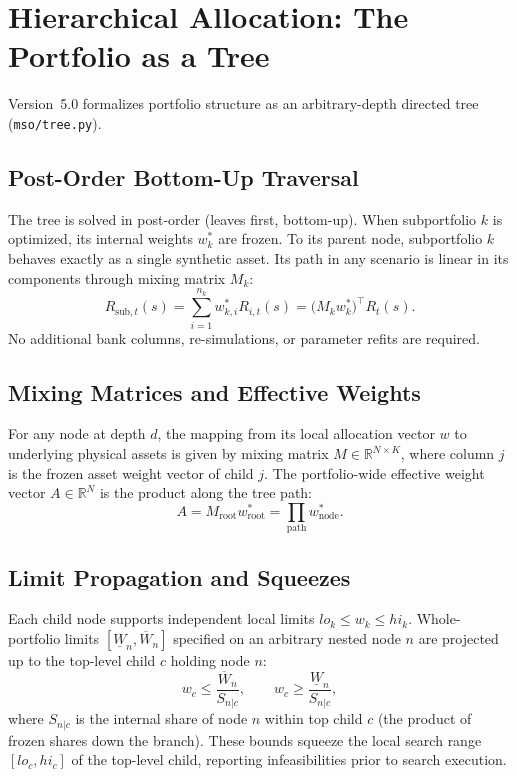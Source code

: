 \documentclass[11pt]{article}
\begin{document}
\section{Hierarchical Allocation: The Portfolio as a Tree}
Version~5.0 formalizes portfolio structure as an arbitrary-depth directed tree (\texttt{mso/tree.py}).

\subsection{Post-Order Bottom-Up Traversal}
The tree is solved in post-order (leaves first, bottom-up). When subportfolio $k$ is optimized, its internal
weights $w_k^*$ are frozen. To its parent node, subportfolio $k$ behaves exactly as a single synthetic asset.
Its path in any scenario is linear in its components through mixing matrix $M_k$:
\begin{equation}
R_{\mathrm{sub}, t}(s) = \sum_{i=1}^{n_k} w_{k, i}^* R_{i, t}(s) = \big(M_k w_k^*\big)^{\top} R_t(s).
\end{equation}
No additional bank columns, re-simulations, or parameter refits are required.

\subsection{Mixing Matrices and Effective Weights}
For any node at depth $d$, the mapping from its local allocation vector $w$ to underlying physical assets
is given by mixing matrix $M \in \mathbb{R}^{N \times K}$, where column $j$ is the frozen asset weight vector
of child $j$. The portfolio-wide effective weight vector $A \in \mathbb{R}^N$ is the product along the tree path:
\begin{equation}
A = M_{\mathrm{root}} w_{\mathrm{root}}^* = \prod_{\mathrm{path}} w_{\mathrm{node}}^*.
\end{equation}

\subsection{Limit Propagation and Squeezes}
Each child node supports independent local limits $lo_k \le w_k \le hi_k$. Whole-portfolio limits
$[\underline{W}_n, \overline{W}_n]$ specified on an arbitrary nested node $n$ are projected up to the
top-level child $c$ holding node $n$:
\begin{equation}
w_c \le \frac{\overline{W}_n}{S_{n|c}}, \qquad w_c \ge \frac{\underline{W}_n}{S_{n|c}},
\end{equation}
where $S_{n|c}$ is the internal share of node $n$ within top child $c$ (the product of frozen shares down the branch).
These bounds squeeze the local search range $[lo_c, hi_c]$ of the top-level child, reporting infeasibilities
prior to search execution.
\end{document}
